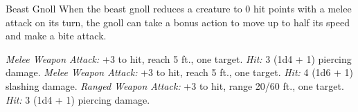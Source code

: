 \documentclass[10pt,a4paper,twoside,twocolumn,openany,bg=print,nodeprecatedcode]{dndbook}
\begin{document}
\begin{DndMonster}[float*=t]{Beast Gnoll}
\DndMonsterBasics[
armor-class = {11},
hit-points = {\DndDice{2d8}},
speed = {30 ft.}
]
\DndMonsterAbilityScores[
 str = 13,
 dex = 12,
 con = 11,
 int = 6,
 wis = 10,
 cha = 7
]
\DndMonsterDetails[
senses = {darkvision 60 ft., passive perception 10},
languages = {Gnoll},
challenge = 1/8,
]
When the beast gnoll reduces a creature to 0 hit points with a melee attack on its turn, the gnoll can take a bonus action to move up to half its speed and make a bite attack.
\par
{}
\textsl{Melee Weapon Attack:} +3 to hit, reach 5 ft., one target. \textsl{Hit:} 3 (1d4 + 1) piercing damage.
\textsl{Melee Weapon Attack:} +3 to hit, reach 5 ft., one target. \textsl{Hit:} 4 (1d6 + 1) slashing damage.
\textsl{Ranged Weapon Attack:} +3 to hit, range 20/60 ft., one target. \textsl{Hit:} 3 (1d4 + 1) piercing damage.
\end{DndMonster}
\end{document}
